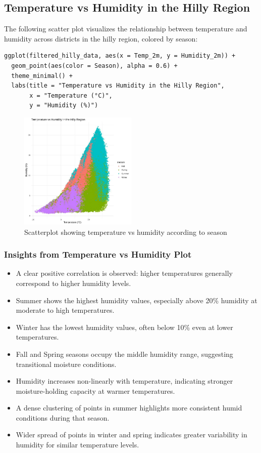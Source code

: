 \subsection*{Temperature vs Humidity in the Hilly Region}

The following scatter plot visualizes the relationship between temperature and humidity across districts in the hilly region, colored by season:

\begin{verbatim}
ggplot(filtered_hilly_data, aes(x = Temp_2m, y = Humidity_2m)) +
  geom_point(aes(color = Season), alpha = 0.6) +
  theme_minimal() +
  labs(title = "Temperature vs Humidity in the Hilly Region",
       x = "Temperature (°C)",
       y = "Humidity (%)")
\end{verbatim}

\begin{figure}[h]
    \centering
    \includegraphics[width=0.5\textwidth]{figures/scatter_hilly.jpg}
    \caption{Scatterplot showing temperature vs humidity according to season}
\end{figure}

\subsubsection*{Insights from Temperature vs Humidity Plot}

\begin{itemize}
    \item A clear positive correlation is observed: higher temperatures generally correspond to higher humidity levels.
    \item Summer shows the highest humidity values, especially above 20\% humidity at moderate to high temperatures.
    \item Winter has the lowest humidity values, often below 10\% even at lower temperatures.
    \item Fall and Spring seasons occupy the middle humidity range, suggesting transitional moisture conditions.
    \item Humidity increases non-linearly with temperature, indicating stronger moisture-holding capacity at warmer temperatures.
    \item A dense clustering of points in summer highlights more consistent humid conditions during that season.
    \item Wider spread of points in winter and spring indicates greater variability in humidity for similar temperature levels.
\end{itemize}

